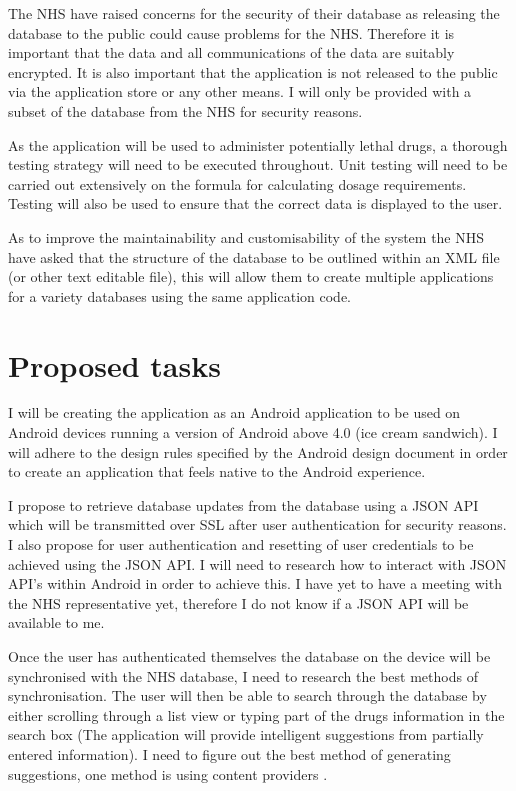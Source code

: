 \documentclass[11pt,fleqn,twoside]{article}
\begin{document}
The NHS have raised concerns for the security of their database as releasing the database to the public could cause problems for the NHS. Therefore it is important that the data and all communications of the data are suitably encrypted. It is also important that the application is not released to the public via the application store or any other means. I will only be provided with a subset of the database from the NHS for security reasons. 

As the application will be used to administer potentially lethal drugs, a thorough testing strategy will need to be executed throughout. Unit testing will need to be carried out extensively on the formula for calculating dosage requirements. Testing will also be used to ensure that the correct data is displayed to the user.

As to improve the maintainability and customisability of the system the NHS have asked that the structure of the database to be outlined within an XML file (or other text editable file), this will allow them to create multiple applications for a variety databases using the same application code.


\section{Proposed tasks}
I will be creating the application as an Android application to be used on Android devices running a version of Android above 4.0 (ice cream sandwich). I will adhere to the design rules specified by the Android design document \cite{AndroidDesign} in order to create an application that feels native to the Android experience.

I propose to retrieve database updates from the database using a JSON \cite{JSONSpec} API which will be transmitted over SSL after user authentication for security reasons. I also propose for user authentication and resetting of user credentials to be achieved using the JSON API. I will need to research how to interact with JSON API's within Android in order to achieve this. I have yet to have a meeting with the NHS representative yet, therefore I do not know if a JSON API will be available to me.

Once the user has authenticated themselves the database on the device will be synchronised with the NHS database, I need to research the best methods of synchronisation. The user will then be able to search through the database by either scrolling through a list view or typing part of the drugs information in the search box (The application will provide intelligent suggestions from partially entered information). I need to figure out the best method of generating suggestions, one method is using content providers \cite{ContentProviders}.
\end{document}
